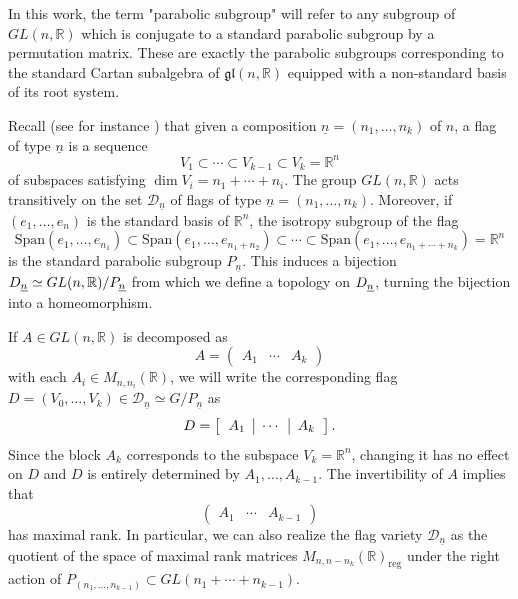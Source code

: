 \documentclass[pdftex]{sigma}
\numberwithin{equation}{section}
\theoremstyle{definition}
\newcommand{\R}{\mathbb{R}}
\newcommand{\D}{\mathcal{D}}
\newcommand{\Span}{\mathrm{Span}}
\newcommand{\gl}{\mathfrak{gl}}
\theoremstyle{plain}
\theoremstyle{plain}
\theoremstyle{plain}
\theoremstyle{plain}
\begin{document}
In this work, the term "parabolic subgroup" will refer to any subgroup of $GL(n,\R)$ which is conjugate to a standard parabolic subgroup by a permutation matrix. These are exactly the parabolic subgroups corresponding to the standard Cartan subalgebra of $\gl(n,\R)$ equipped with a non-standard basis of its root system.

Recall (see for instance \cite[Section $1.2$]{Brion}) that given a composition $\underline n = (n_1,\dots,n_k)$ of $n$, a flag of type $\underline n$ is a sequence
\begin{equation*}
	V_1 \subset \cdots \subset V_{k-1} \subset V_k = \R^n
\end{equation*}
of subspaces satisfying $\dim V_i = n_1+\cdots+n_i$. The group $GL(n,\R)$ acts transitively on the set $\D_{\underline n}$ of flags of type $\underline n = (n_1,\dots,n_k)$. Moreover, if $(e_1,\dots,e_n)$ is the standard basis of $\R^n$, the isotropy subgroup of the flag
\begin{equation*}
	\Span(e_1,\dots,e_{n_1}) \subset \Span(e_1,\dots,e_{n_1+n_2}) \subset \cdots \subset \Span(e_1,\dots,e_{n_1+\cdots+n_k}) = \R^n
\end{equation*}
is the standard parabolic subgroup $P_{\underline n}$. This induces a bijection $\mathcal \D_{\underline n} \simeq GL(n,\R)/P_{\underline n}$ from which we define a topology on $\mathcal \D_{\underline n}$, turning the bijection into a homeomorphism.

If $A \in GL(n,\R)$ is decomposed as
\begin{equation*}
	A = \begin{pmatrix}
	A_1 & \cdots & A_{k}
\end{pmatrix}
\end{equation*}
with each $A_i \in M_{n,n_i}(\R)$, we will write the corresponding flag $D = (V_0,\dots,V_k) \in \D_{\underline n} \simeq G/P_{\underline n}$ as
\begin{equation*}
	D = \left[\begin{tabular}{c|c|c}
	$A_1$ & $\cdots$ & $A_{k}$
\end{tabular}\right].
\end{equation*}
Since the block $A_k$ corresponds to the subspace $V_k = \R^n$, changing it has no effect on $D$ and $D$ is entirely determined by $A_1,\dots,A_{k-1}$. The invertibility of $A$ implies that
\begin{equation*}
	\begin{pmatrix}
	A_1 & \cdots & A_{k-1}
\end{pmatrix}
\end{equation*}
has maximal rank. In particular, we can also realize the flag variety $\D_{\underline n}$ as the quotient of the space of maximal rank matrices $M_{n,n-n_k}(\R)_{\mathrm{reg}}$ under the right action of $P_{(n_1,\dots,n_{k-1})} \subset GL(n_1+\cdots+n_{k-1})$.
\end{document}
